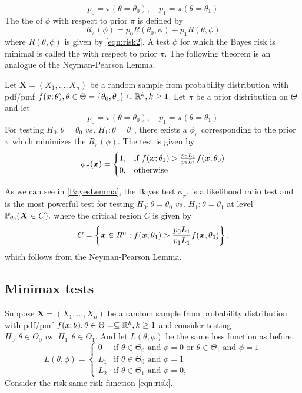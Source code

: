 $$
p_0 = \pi(\theta = \theta_0), \quad p_1 = \pi(\theta = \theta_1) 
$$
The the  of $\phi$ with respect to prior $\pi$ is defined by
$$
R_{\pi}(\phi) = p_0R(\theta_0,\phi) + p_1R(\theta,\phi)
$$
where $R(\theta,\phi)$ is given by \eqref{eqn:risk2}. A test $\phi$ for which the Bayes risk is minimal is called the  with respect to prior $\pi$. The following theorem is an analogue of the Neyman-Pearson Lemma.

\begin{theorem}\label{BayesLemma}
    Let $\boldsymbol{X} = (X_1,...,X_n)$ be a random sample from probability distribution with pdf/pmf $f(x;\theta), \theta \in \Theta = \{\theta_0,\theta_1 \} \subseteq \mathbb R^{k}, k \geq 1$.  
    Let $\pi$ be a prior distribution on $\Theta$ and let
    $$
    p_0 = \pi(\theta = \theta_0), \quad p_1 = \pi(\theta = \theta_1) 
    $$
    For testing $H_0: \theta = \theta_0 \textit{ vs. } H_1: \theta = \theta_1$,
    there exists a  $\phi_{\pi}$ corresponding to the prior $\pi$ which minimizes the  $R_{\pi}(\phi)$. The test is given by 
    $$
    \phi_{\pi}(\boldsymbol{x}) = 
    \begin{cases}
    1, & \text{if }  f(\boldsymbol{x};\theta_1) > \frac{p_0L_1}{p_1L_1}f(\boldsymbol{x}, \theta_0)  \\
    0, & \text{otherwise}
    \end{cases}
    $$
\end{theorem}
As we can see in \ref{BayesLemma}, the Bayes test $\phi_{\pi}$, is a likelihood ratio test and is the most powerful test for testing $H_0: \theta = \theta_0 \textit{ vs. } H_1: \theta = \theta_1$ at level $\mathbb P_{\theta_0}(\boldsymbol{X} \in C),$ where the critical region $C$ is given by
$$
C = \left\{ 
\boldsymbol{x} \in R^n : f(\boldsymbol{x};\theta_1) > \frac{p_0L_1}{p_1L_1}f(\boldsymbol{x}, \theta_0)
\right\},
$$
which follows from the Neyman-Pearson Lemma.
\subsection{Minimax tests}
Suppose $\boldsymbol{X} = (X_1,...,X_n)$ be a random sample from probability distribution with pdf/pmf $f(x;\theta), \theta \in \Theta = \subseteq \mathbb R^{k}, k \geq 1$ and consider testing $H_0: \theta \in \Theta_0 \textit{ vs. } H_1: \theta \in \Theta_1$. And let $L(\theta, \phi)$ be the same loss function as before, 
$$
L(\theta,\phi) = 
    \begin{cases}
     0 & \text{if }  \theta \in \Theta_0 \text{ and } \phi = 0 \text{ or } \theta \in \Theta_1 \text{ and } \phi = 1\\
     L_1  & \text{if }  \theta \in \Theta_0 \text{ and } \phi = 1 \\
     L_2 & \text{if }  \theta \in \Theta_1 \text{ and } \phi = 0,
    \end{cases}
$$
Consider the risk same risk function \eqref{eqn:risk}. 


